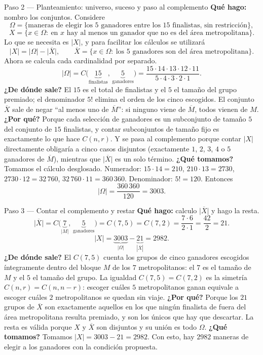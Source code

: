 \documentclass[11pt]{article}
\begin{document}
\begin{sol}
\begin{paso}{Paso 2 --- Planteamiento: universo, suceso y paso al complemento}
\textbf{Qué hago:} nombro los conjuntos. Considere
\[
\Omega=\{\text{maneras de elegir los 5 ganadores entre los 15 finalistas, sin restricción}\},
\]
\[
X=\{x\in\Omega:\ \text{en }x\text{ hay al menos un ganador que no es del área metropolitana}\} .
\]
Lo que se necesita es $|X|$, y para facilitar los cálculos se utilizará
\[
|X|=|\Omega|-\bigl|\overline{X}\bigr|,\qquad
\overline{X}=\{x\in\Omega:\ \text{los 5 ganadores son del área metropolitana}\} .
\]
Ahora se calcula cada cardinalidad por separado.
\[
|\Omega|=C\bigl(\underbrace{15}_{\text{finalistas}},\,\underbrace{5}_{\text{ganadores}}\bigr)
=\frac{15\cdot 14\cdot 13\cdot 12\cdot 11}{5\cdot 4\cdot 3\cdot 2\cdot 1} .
\]
\textbf{¿De dónde sale?} El $15$ es el total de finalistas y el $5$ el tamaño del grupo premiado; el denominador $5!$ elimina el orden de los cinco escogidos. El conjunto $\overline{X}$ sale de negar ``al menos uno de $\overline{M}$'': si ninguno viene de $\overline{M}$, todos vienen de $M$.
\textbf{¿Por qué?} Porque cada selección de ganadores es un subconjunto de tamaño $5$ del conjunto de $15$ finalistas, y contar subconjuntos de tamaño fijo es exactamente lo que hace $C(n,r)$. Y se pasa al complemento porque contar $|X|$ directamente obligaría a cinco casos disjuntos (exactamente $1$, $2$, $3$, $4$ o $5$ ganadores de $\overline{M}$), mientras que $\bigl|\overline{X}\bigr|$ es un solo término.
\textbf{¿Qué tomamos?} Tomamos el cálculo desglosado. Numerador: $15\cdot 14=210$, $210\cdot 13=2730$, $2730\cdot 12=32\,760$, $32\,760\cdot 11=360\,360$. Denominador: $5!=120$. Entonces
\[
|\Omega|=\frac{360\,360}{120}=3003 .
\]
\end{paso}

\begin{paso}{Paso 3 --- Contar el complemento y restar}
\textbf{Qué hago:} calculo $\bigl|\overline{X}\bigr|$ y hago la resta.
\[
\bigl|\overline{X}\bigr|=C\bigl(\underbrace{7}_{|M|},\,\underbrace{5}_{\text{ganadores}}\bigr)=C(7,5)=C(7,2)=\frac{7\cdot 6}{2\cdot 1}=\frac{42}{2}=21 .
\]
\[
|X|=\underbrace{3003}_{|\Omega|}-\underbrace{21}_{|\overline{X}|}=2982 .
\]
\textbf{¿De dónde sale?} El $C(7,5)$ cuenta los grupos de cinco ganadores escogidos íntegramente dentro del bloque $M$ de los $7$ metropolitanos: el $7$ es el tamaño de $M$ y el $5$ el tamaño del grupo. La igualdad $C(7,5)=C(7,2)$ es la simetría $C(n,r)=C(n,n-r)$: escoger cuáles $5$ metropolitanos ganan equivale a escoger cuáles $2$ metropolitanos se quedan sin viaje.
\textbf{¿Por qué?} Porque los $21$ grupos de $\overline{X}$ son exactamente aquellos en los que ningún finalista de fuera del área metropolitana resulta premiado, y son los únicos que hay que descartar. La resta es válida porque $X$ y $\overline{X}$ son disjuntos y su unión es todo $\Omega$.
\textbf{¿Qué tomamos?} Tomamos $|X|=3003-21=2982$. Con esto, hay $2982$ maneras de elegir a los ganadores con la condición propuesta.
\end{paso}


\end{sol}
\end{document}

